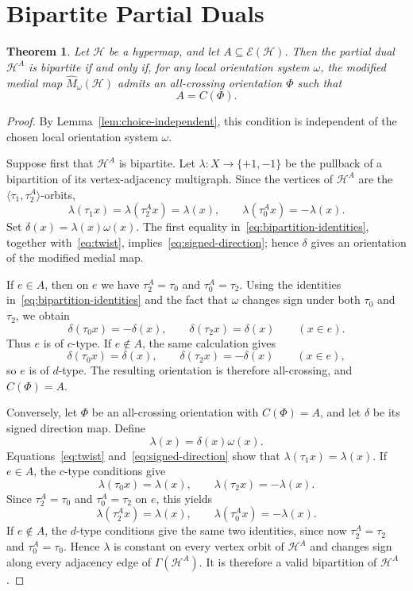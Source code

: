 \documentclass[10pt,a4paper]{article}
\newtheorem{theorem}{Theorem}[section]
\theoremstyle{definition}
\theoremstyle{remark}
\newcommand{\Hcal}{\mathcal{H}}
\newcommand{\Ecal}{\mathcal{E}}
\begin{document}
\section{Bipartite Partial Duals}


\begin{theorem}\label{thm:bipartite}
Let $\Hcal$ be a hypermap, and let $A\subseteq\Ecal(\Hcal)$. Then the partial dual $\Hcal^A$ is bipartite if and only if, for any local orientation system $\omega$, the modified medial map $\widehat M_\omega(\Hcal)$ admits an all-crossing orientation $\Phi$ such that
\[
A=C(\Phi).
\]
\end{theorem}



\begin{proof} By Lemma~\ref{lem:choice-independent}, this condition is independent of the chosen local orientation system $\omega$.

Suppose first that $\Hcal^A$ is bipartite. Let $\lambda:X\to\{+1,-1\}$ be the pullback of a bipartition of its vertex-adjacency multigraph. Since the vertices of $\Hcal^A$ are the $\langle\tau_1,\tau_2^A\rangle$-orbits,
\[
 \lambda(\tau_1x)=\lambda(\tau_2^Ax)=\lambda(x),
 \qquad
 \lambda(\tau_0^Ax)=-\lambda(x).\tag{B}\label{eq:bipartition-identities}
\]
Set $\delta(x)=\lambda(x)\omega(x)$. The first equality in~\eqref{eq:bipartition-identities}, together with~\eqref{eq:twist}, implies~\eqref{eq:signed-direction}; hence $\delta$ gives an orientation of the modified medial map.

If $e\in A$, then on $e$ we have $\tau_2^A=\tau_0$ and $\tau_0^A=\tau_2$. Using the identities in~\eqref{eq:bipartition-identities} and the fact that $\omega$ changes sign under both $\tau_0$ and $\tau_2$, we obtain
\[
 \delta(\tau_0x)=-\delta(x),\qquad
 \delta(\tau_2x)=\delta(x)\qquad(x\in e).
\]
Thus $e$ is of $c$-type. If $e\notin A$, the same calculation gives
\[
 \delta(\tau_0x)=\delta(x),\qquad
 \delta(\tau_2x)=-\delta(x)\qquad(x\in e),
\]
so $e$ is of $d$-type. The resulting orientation is therefore all-crossing, and $C(\Phi)=A$.

Conversely, let $\Phi$ be an all-crossing orientation with $C(\Phi)=A$, and let $\delta$ be its signed direction map. Define
\[
 \lambda(x)=\delta(x)\omega(x).
\]
Equations~\eqref{eq:twist} and~\eqref{eq:signed-direction} show that $\lambda(\tau_1x)=\lambda(x)$. If $e\in A$, the $c$-type conditions give
\[
 \lambda(\tau_0x)=\lambda(x),\qquad
 \lambda(\tau_2x)=-\lambda(x).
\]
Since $\tau_2^A=\tau_0$ and $\tau_0^A=\tau_2$ on $e$, this yields
\[
 \lambda(\tau_2^Ax)=\lambda(x),\qquad
 \lambda(\tau_0^Ax)=-\lambda(x).
\]
If $e\notin A$, the $d$-type conditions give the same two identities, since now $\tau_2^A=\tau_2$ and $\tau_0^A=\tau_0$. Hence $\lambda$ is constant on every vertex orbit of $\Hcal^A$ and changes sign along every adjacency edge of $\Gamma(\Hcal^A)$. It is therefore a valid bipartition of $\Hcal^A$.
\end{proof}
\end{document}
